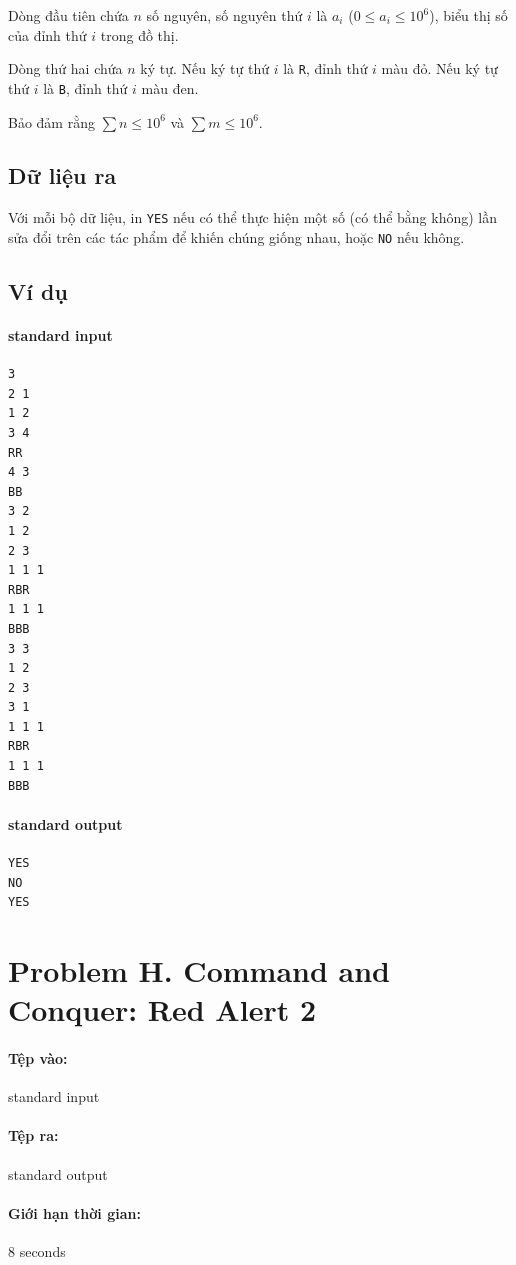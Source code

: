 \documentclass[11pt]{article}
\begin{document}
Dòng đầu tiên chứa \(n\) số nguyên, số nguyên thứ \(i\) là \(a_i\)
(\(0\le a_i\le 10^6\)), biểu thị số của đỉnh thứ \(i\) trong đồ thị.

Dòng thứ hai chứa \(n\) ký tự. Nếu ký tự thứ \(i\) là \texttt{R}, đỉnh thứ
\(i\) màu đỏ. Nếu ký tự thứ \(i\) là \texttt{B}, đỉnh thứ \(i\) màu đen.

Bảo đảm rằng \(\sum n\le 10^6\) và \(\sum m\le 10^6\).

\subsection*{Dữ liệu ra}

Với mỗi bộ dữ liệu, in \texttt{YES} nếu có thể thực hiện một số (có thể bằng
không) lần sửa đổi trên các tác phẩm để khiến chúng giống nhau, hoặc
\texttt{NO} nếu không.

\subsection*{Ví dụ}

\paragraph{standard input}
\begin{verbatim}
3
2 1
1 2
3 4
RR
4 3
BB
3 2
1 2
2 3
1 1 1
RBR
1 1 1
BBB
3 3
1 2
2 3
3 1
1 1 1
RBR
1 1 1
BBB
\end{verbatim}

\paragraph{standard output}
\begin{verbatim}
YES
NO
YES
\end{verbatim}

\section{Problem H. Command and Conquer: Red Alert 2}

\paragraph{Tệp vào:} standard input
\paragraph{Tệp ra:} standard output
\paragraph{Giới hạn thời gian:} 8 seconds
\end{document}
